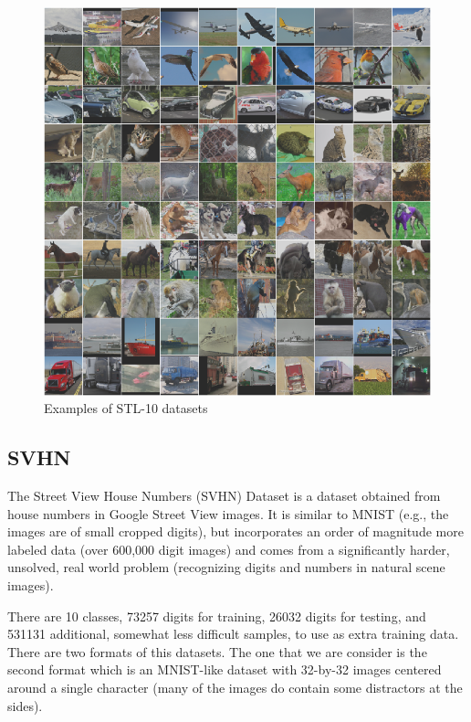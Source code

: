\begin{figure}[h]
	\includegraphics[scale=0.3]{figures/stl}
	\centering
	\caption{Examples of STL-10 datasets \cite{coates2011analysis}}
	\label{fig:svhn}
\end{figure}

\subsection{SVHN}
The Street View House Numbers (SVHN) Dataset \cite{netzer2011reading} is a dataset obtained from house numbers in Google Street View images. It is similar to MNIST (e.g., the images are of small cropped digits), but incorporates an order of magnitude more labeled data (over 600,000 digit images) and comes from a significantly harder, unsolved, real world problem (recognizing digits and numbers in natural scene images).

There are 10 classes, 73257 digits for training, 26032 digits for testing, and 531131 additional, somewhat less difficult samples, to use as extra training data. There are two formats of this datasets. The one that we are consider is the second format which is an MNIST-like dataset with 32-by-32 images centered around a single character (many of the images do contain some distractors at the sides).

